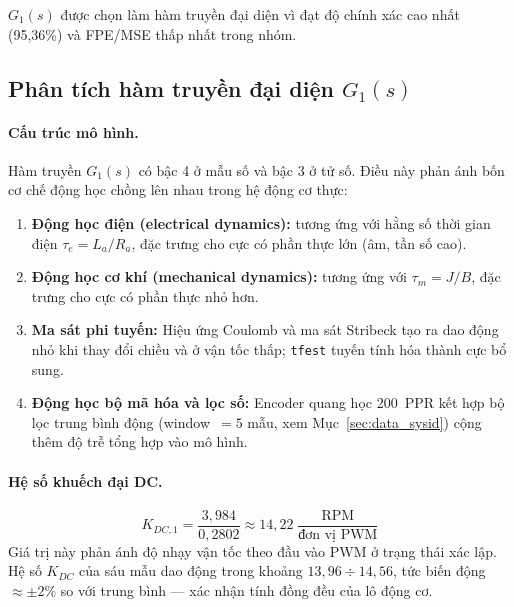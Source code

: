 $G_1(s)$ được chọn làm hàm truyền đại diện vì đạt độ chính xác cao nhất
(95,36\%) và FPE/MSE thấp nhất trong nhóm.

\subsection{Phân tích hàm truyền đại diện $G_1(s)$}
\label{subsec:tf1_analysis}

\paragraph{Cấu trúc mô hình.}
Hàm truyền $G_1(s)$ có bậc 4 ở mẫu số và bậc 3 ở tử số.
Điều này phản ánh bốn cơ chế động học chồng lên nhau trong hệ động cơ thực:
\begin{enumerate}
    \item \textbf{Động học điện (electrical dynamics):} tương ứng với hằng số
    thời gian điện $\tau_e = L_a/R_a$, đặc trưng cho cực có phần thực lớn (âm, tần số cao).

    \item \textbf{Động học cơ khí (mechanical dynamics):} tương ứng với
    $\tau_m = J/B$, đặc trưng cho cực có phần thực nhỏ hơn.

    \item \textbf{Ma sát phi tuyến:} Hiệu ứng Coulomb và ma sát Stribeck tạo
    ra dao động nhỏ khi thay đổi chiều và ở vận tốc thấp;
    \texttt{tfest} tuyến tính hóa thành cực bổ sung.

    \item \textbf{Động học bộ mã hóa và lọc số:} Encoder quang học 200~PPR
    kết hợp bộ lọc trung bình động (window~$=5$ mẫu, xem Mục~\ref{sec:data_sysid})
    cộng thêm độ trễ tổng hợp vào mô hình.
\end{enumerate}

\paragraph{Hệ số khuếch đại DC.}
\begin{equation}
    K_{DC,1} = \frac{3{,}984}{0{,}2802} \approx 14{,}22 \; \frac{\text{RPM}}{\text{đơn vị PWM}}
\end{equation}
Giá trị này phản ánh độ nhạy vận tốc theo đầu vào PWM ở trạng thái xác lập.
Hệ số $K_{DC}$ của sáu mẫu dao động trong khoảng $13{,}96 \div 14{,}56$,
tức biến động $\approx \pm 2\%$ so với trung bình — xác nhận tính đồng đều của
lô động cơ.

